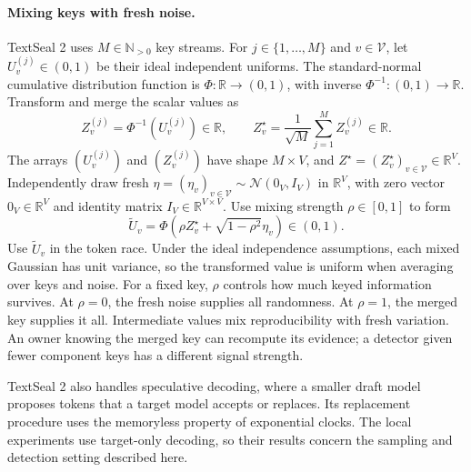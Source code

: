 \paragraph{Mixing keys with fresh noise.}
TextSeal 2 uses $M\in\mathbb N_{>0}$ key streams. For $j\in\{1,\ldots,M\}$ and $v\in\mathcal V$, let $U_v^{(j)}\in(0,1)$ be their ideal independent uniforms. The standard-normal cumulative distribution function is $\Phi:\mathbb R\to(0,1)$, with inverse $\Phi^{-1}:(0,1)\to\mathbb R$. Transform and merge the scalar values as
\begin{equation}
\label{eq:textseal-gaussian-key}
 Z_v^{(j)}=\Phi^{-1}(U_v^{(j)})\in\mathbb R,\qquad
 Z_v^\star=\frac1{\sqrt M}\sum_{j=1}^M Z_v^{(j)}\in\mathbb R.
\end{equation}
The arrays $(U_v^{(j)})$ and $(Z_v^{(j)})$ have shape $M\times V$, and $Z^\star=(Z_v^\star)_{v\in\mathcal V}\in\mathbb R^V$. Independently draw fresh $\eta=(\eta_v)_{v\in\mathcal V}\sim\mathcal N(0_V,I_V)$ in $\mathbb R^V$, with zero vector $0_V\in\mathbb R^V$ and identity matrix $I_V\in\mathbb R^{V\times V}$. Use mixing strength $\rho\in[0,1]$ to form
\begin{equation}
\label{eq:textseal-noise-mix}
 \widetilde U_v=
 \Phi\!\left(\rho Z_v^\star+\sqrt{1-\rho^2}\eta_v\right)\in(0,1).
\end{equation}
Use $\widetilde U_v$ in the token race. Under the ideal independence assumptions, each mixed Gaussian has unit variance, so the transformed value is uniform when averaging over keys and noise. For a fixed key, $\rho$ controls how much keyed information survives. At $\rho=0$, the fresh noise supplies all randomness. At $\rho=1$, the merged key supplies it all. Intermediate values mix reproducibility with fresh variation. An owner knowing the merged key can recompute its evidence; a detector given fewer component keys has a different signal strength.

TextSeal 2 also handles speculative decoding, where a smaller draft model proposes tokens that a target model accepts or replaces. Its replacement procedure uses the memoryless property of exponential clocks. The local experiments use target-only decoding, so their results concern the sampling and detection setting described here.
